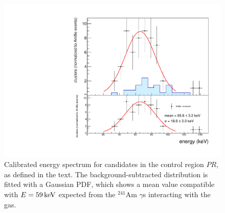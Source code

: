\begin{figure}[ht]
  \begin{center}
  \includegraphics[width=0.60\linewidth]{figures/calintegral_59keV}

  \caption{Calibrated energy spectrum for candidates in the control
    region $PR$, as defined in the text. The background-subtracted
    distribution is fitted with a Gaussian PDF, which shows a mean
    value compatible with $E=59\,\textrm{ke\hspace{-.08em}V}$ expected from the $^{241}$Am
    $\gamma$s interacting with the gas. \label{fig:59keV}}

  \end{center}
\end{figure}



